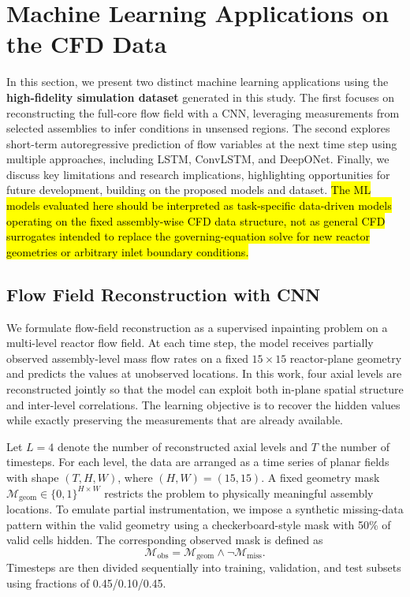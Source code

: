 \documentclass[review]{elsarticle}
\theoremstyle{definition}
\theoremstyle{definition}
\theoremstyle{remark}
\begin{document}
\section{Machine Learning Applications on the CFD Data}
\label{sec:ml_res}

In this section, we present two distinct machine learning applications using the \textbf{high-fidelity simulation dataset} generated in this study. The first focuses on reconstructing the full-core flow field with a CNN, leveraging measurements from selected assemblies to infer conditions in unsensed regions. The second explores short-term autoregressive prediction of flow variables at the next time step using multiple approaches, including LSTM, ConvLSTM, and DeepONet. Finally, we discuss key limitations and research implications, highlighting opportunities for future development, building on the proposed models and dataset. \hl{The ML models evaluated here should be interpreted as task-specific data-driven models operating on the fixed assembly-wise CFD data structure, not as general CFD surrogates intended to replace the governing-equation solve for new reactor geometries or arbitrary inlet boundary conditions.}

\subsection{Flow Field Reconstruction with CNN}
\label{sec:flow_recon}

We formulate flow-field reconstruction as a supervised inpainting problem on a multi-level reactor flow field. At each time step, the model receives partially observed assembly-level mass flow rates on a fixed $15\times15$ reactor-plane geometry and predicts the values at unobserved locations. In this work, four axial levels are reconstructed jointly so that the model can exploit both in-plane spatial structure and inter-level correlations. The learning objective is to recover the hidden values while exactly preserving the measurements that are already available.

Let $L=4$ denote the number of reconstructed axial levels and $T$ the number of timesteps. For each level, the data are arranged as a time series of planar fields with shape $(T,H,W)$, where $(H,W)=(15,15)$. A fixed geometry mask $\mathcal{M}_{\mathrm{geom}}\in\{0,1\}^{H\times W}$ restricts the problem to physically meaningful assembly locations. To emulate partial instrumentation, we impose a synthetic missing-data pattern within the valid geometry using a checkerboard-style mask with 50\% of valid cells hidden. The corresponding observed mask is defined as
\[
\mathcal{M}_{\mathrm{obs}}=\mathcal{M}_{\mathrm{geom}}\land \neg \mathcal{M}_{\mathrm{miss}}.
\]
Timesteps are then divided sequentially into training, validation, and test subsets using fractions of 0.45/0.10/0.45.
\end{document}
